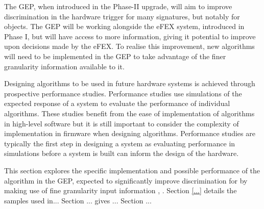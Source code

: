 
The \ac{GEP}, when introduced in the Phase-II upgrade, will aim to improve
discrimination in the hardware trigger for many signatures, but notably for
\egamma objects. The \ac{GEP} will be working alongside the \ac{eFEX} system,
introduced in Phase I, but will have access to more information, giving it
potential to improve upon decisions made by the \ac{eFEX}. To realise this
improvement, new algorithms will need to be implemented in the \ac{GEP} to take
advantage of the finer granularity information available to it.

Designing algorithms to be used in future hardware systems is achieved through
prospective performance studies. Performance studies use simulations of the
expected response of a system to evaluate the performance of individual
algorithms. These studies benefit from the ease of implementation of algorithms
in high-level software but it is still important to consider the complexity of
implementation in firmware when designing algorithms. Performance studies are
typically the first step in designing a system as evaluating performance in
simulations before a system is built can inform the design of the hardware.

This section explores the specific implementation and possible performance of
the \eratio algorithm in the \ac{GEP}, expected to significantly improve
discrimination for \egamma by making use of fine granularity input information
\cite[p.~126]{CERN-LHCC-2017-020},
\eratio.
%
Section \ref{...} details the samples used in...
Section ... gives ...
Section ...
